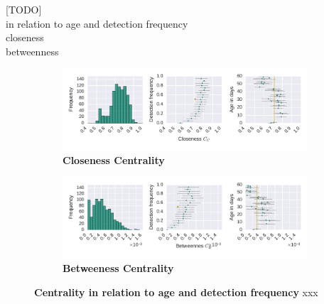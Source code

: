 [TODO]\\
in relation to age and detection frequency\\
closeness\\
betweenness\\

\begin{figure}[!htb]
	\centering
	\begin{subfigure}[b]{1.0\textwidth}
	\centering
	\includegraphics[width=1.0\textwidth]{Figures/n3-stat-closenessAgeDetF.pdf}
	\caption[Closeness Centrality]{\textbf{Closeness Centrality}}
	\label{fig:n3-closeness}
	\end{subfigure}
	\begin{subfigure}[b]{1.0\textwidth}
	\centering
	\includegraphics[width=1.0\textwidth]{Figures/n3-stat-betweenAgeDetF.pdf}
	\caption[Betweeness Centrality]{\textbf{Betweeness Centrality}}
	\label{fig:n3-between}
	\end{subfigure}
	\caption[Centrality]{\textbf{Centrality in relation to age and detection frequency} xxx}
	\label{fig:n3-centrality}
\end{figure}
